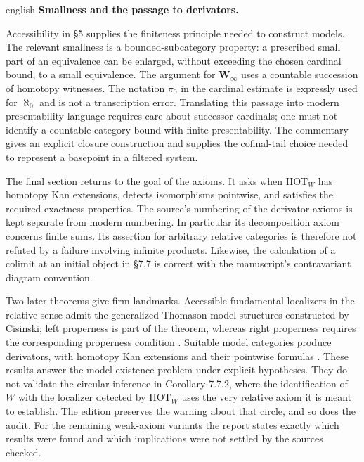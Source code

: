 \begin{otherlanguage*}{english}
\medskip\noindent\textbf{Smallness and the passage to derivators.}

Accessibility in \S5 supplies the finiteness principle needed to construct models. The relevant smallness is a bounded-subcategory property: a prescribed small part of an equivalence can be enlarged, without exceeding the chosen cardinal bound, to a small equivalence. The argument for $\mathbf W_\infty$ uses a countable succession of homotopy witnesses. The notation $\pi_0$ in the cardinal estimate is expressly used for $\aleph_0$ and is not a transcription error. Translating this passage into modern presentability language requires care about successor cardinals; one must not identify a countable-category bound with finite presentability. The commentary gives an explicit closure construction and supplies the cofinal-tail choice needed to represent a basepoint in a filtered system.

The final section returns to the goal of the axioms. It asks when $\mathrm{HOT}_W$ has homotopy Kan extensions, detects isomorphisms pointwise, and satisfies the required exactness properties. The source's numbering of the derivator axioms is kept separate from modern numbering. In particular its decomposition axiom concerns finite sums. Its assertion for arbitrary relative categories is therefore not refuted by a failure involving infinite products. Likewise, the calculation of a colimit at an initial object in \S7.7 is correct with the manuscript's contravariant diagram convention.

Two later theorems give firm landmarks. Accessible fundamental localizers in the relative sense admit the generalized Thomason model structures constructed by Cisinski; left properness is part of the theorem, whereas right properness requires the corresponding properness condition \citep[Theorem 5.2.15]{Cisinski2006}. Suitable model categories produce derivators, with homotopy Kan extensions and their pointwise formulas \citep{Cisinski2003,Groth2013}. These results answer the model-existence problem under explicit hypotheses. They do not validate the circular inference in Corollary 7.7.2, where the identification of $W$ with the localizer detected by $\mathrm{HOT}_W$ uses the very relative axiom it is meant to establish. The edition preserves the warning about that circle, and so does the audit. For the remaining weak-axiom variants the report states exactly which results were found and which implications were not settled by the sources checked.

\end{otherlanguage*}
